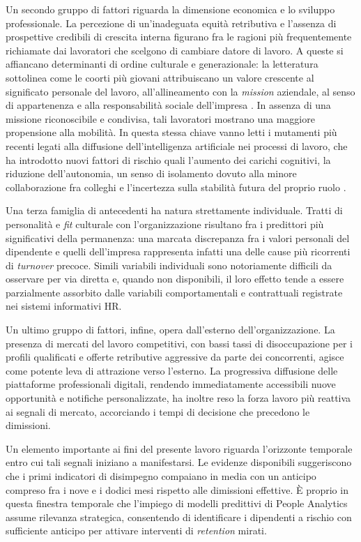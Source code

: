 Un secondo gruppo di fattori riguarda la dimensione economica e lo sviluppo professionale. La percezione di un'inadeguata equità retributiva e l'assenza di prospettive credibili di crescita interna figurano fra le ragioni più frequentemente richiamate dai lavoratori che scelgono di cambiare datore di lavoro. A queste si affiancano determinanti di ordine culturale e generazionale: la letteratura sottolinea come le coorti più giovani attribuiscano un valore crescente al significato personale del lavoro, all'allineamento con la \textit{mission} aziendale, al senso di appartenenza e alla responsabilità sociale dell'impresa \cite{deloitte2026trends}. In assenza di una missione riconoscibile e condivisa, tali lavoratori mostrano una maggiore propensione alla mobilità. In questa stessa chiave vanno letti i mutamenti più recenti legati alla diffusione dell'intelligenza artificiale nei processi di lavoro, che ha introdotto nuovi fattori di rischio quali l'aumento dei carichi cognitivi, la riduzione dell'autonomia, un senso di isolamento dovuto alla minore collaborazione fra colleghi e l'incertezza sulla stabilità futura del proprio ruolo \cite{deloitte2026trends}.

Una terza famiglia di antecedenti ha natura strettamente individuale. Tratti di personalità e \textit{fit} culturale con l'organizzazione risultano fra i predittori più significativi della permanenza: una marcata discrepanza fra i valori personali del dipendente e quelli dell'impresa rappresenta infatti una delle cause più ricorrenti di \textit{turnover} precoce. Simili variabili individuali sono notoriamente difficili da osservare per via diretta e, quando non disponibili, il loro effetto tende a essere parzialmente assorbito dalle variabili comportamentali e contrattuali registrate nei sistemi informativi HR.

Un ultimo gruppo di fattori, infine, opera dall'esterno dell'organizzazione. La presenza di mercati del lavoro competitivi, con bassi tassi di disoccupazione per i profili qualificati e offerte retributive aggressive da parte dei concorrenti, agisce come potente leva di attrazione verso l'esterno. La progressiva diffusione delle piattaforme professionali digitali, rendendo immediatamente accessibili nuove opportunità e notifiche personalizzate, ha inoltre reso la forza lavoro più reattiva ai segnali di mercato, accorciando i tempi di decisione che precedono le dimissioni.

Un elemento importante ai fini del presente lavoro riguarda l'orizzonte temporale entro cui tali segnali iniziano a manifestarsi. Le evidenze disponibili suggeriscono che i primi indicatori di disimpegno compaiano in media con un anticipo compreso fra i nove e i dodici mesi rispetto alle dimissioni effettive. È proprio in questa finestra temporale che l'impiego di modelli predittivi di People Analytics assume rilevanza strategica, consentendo di identificare i dipendenti a rischio con sufficiente anticipo per attivare interventi di \textit{retention} mirati.

